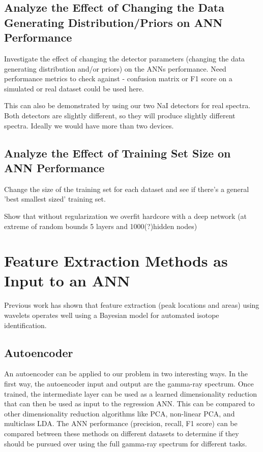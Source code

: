 \documentclass[thesis,tocnosub,noragright,centerchapter,12pt,fullpage]{uiucecethesis09}
\begin{document}
\subsection{Analyze the Effect of Changing the Data Generating Distribution/Priors on ANN Performance}

    Investigate the effect of changing the detector parameters (changing the data generating distribution and/or priors) on the ANNs performance. Need performance metrics to check against - confusion matrix or F1 score on a simulated or real dataset could be used here. 
    
    This can also be demonstrated by using our two NaI detectors for real spectra. Both detectors are slightly different, so they will produce slightly different spectra. Ideally we would have more than two devices.
    
\subsection{Analyze the Effect of Training Set Size on ANN Performance} 


    Change the size of the training set for each dataset and see if there's a general 'best smallest sized' training set.
    
    


Show  that  without  regularization  we  overfit  hardcore  with a deep network (at extreme of random bounds 5 layers and 1000(?)hidden nodes)


\section{Feature Extraction Methods as Input to an ANN}


Previous work has shown that feature extraction (peak locations and areas) using wavelets operates well using a Bayesian model for automated isotope identification. 

\subsection{Autoencoder}


An autoencoder can be applied to our problem in two interesting ways. In the first way, the autoencoder input and output are the gamma-ray spectrum. Once trained, the intermediate layer can be used as a learned dimensionality reduction that can then be used as input to the regression ANN. This can be compared to other dimensionality reduction algorithms like PCA, non-linear PCA, and multiclass LDA. The ANN performance (precision, recall, F1 score) can be compared between these methods on different datasets to determine if they should be pursued over using the full gamma-ray spectrum for different tasks.
\end{document}
